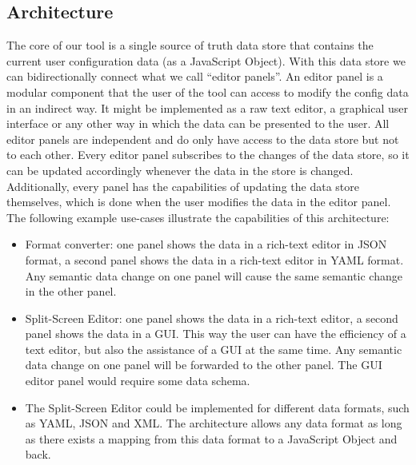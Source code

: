 \subsection{Architecture}\label{subsec:architecture} %
The core of our tool is a single source of truth data store that contains the current user configuration data (as a JavaScript Object).
With this data store we can bidirectionally connect what we call ``editor panels''.
An editor panel is a modular component that the user of the tool can access to modify the config data in an indirect way.
It might be implemented as a raw text editor, a graphical user interface or any other way in which the data can be presented to the user.
All editor panels are independent and do only have access to the data store but not to each other.
Every editor panel subscribes to the changes of the data store, so it can be updated accordingly whenever the data in the store is changed.
Additionally, every panel has the capabilities of updating the data store themselves, which is done when the user modifies the data in the editor panel.
The following example use-cases illustrate the capabilities of this architecture:

\begin{itemize}
    \item Format converter: one panel shows the data in a rich-text editor in JSON format, a second panel shows the data in a rich-text editor in YAML format. Any semantic data change on one panel will cause the same semantic change in the other panel.
    \item Split-Screen Editor: one panel shows the data in a rich-text editor, a second panel shows the data in a GUI. This way the user can have the efficiency of a text editor, but also the assistance of a GUI at the same time. Any semantic data change on one panel will be forwarded to the other panel. The GUI editor panel would require some data schema.
    \item The Split-Screen Editor could be implemented for different data formats, such as YAML, JSON and XML. The architecture allows any data format as long as there exists a mapping from this data format to a JavaScript Object and back.
\end{itemize}



